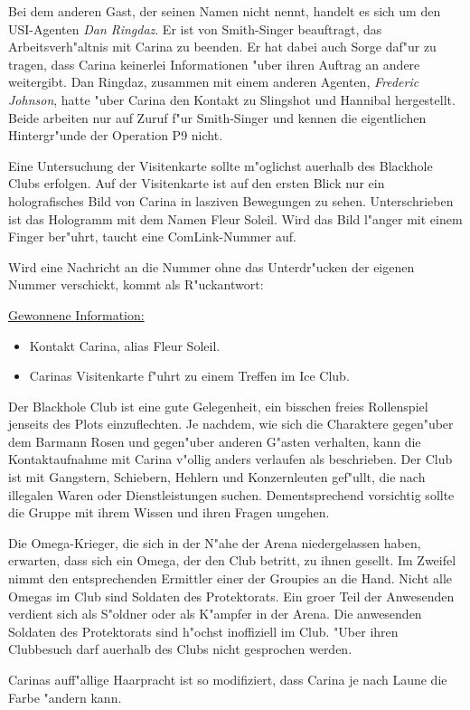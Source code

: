 Bei dem anderen Gast, der seinen Namen nicht nennt, handelt es sich um den USI-Agenten \emph{Dan Ringdaz}. Er ist von Smith-Singer beauftragt, das Arbeitsverh"altnis mit Carina zu beenden. Er hat dabei auch Sorge daf"ur zu tragen, dass Carina keinerlei Informationen "uber ihren Auftrag an andere weitergibt. Dan Ringdaz, zusammen mit einem anderen Agenten, \emph{Frederic Johnson}, hatte "uber Carina den Kontakt zu Slingshot und Hannibal hergestellt. Beide arbeiten nur auf Zuruf f"ur Smith-Singer und kennen die eigentlichen Hintergr"unde der Operation P9 nicht.


Eine Untersuchung der Visitenkarte sollte m"oglichst au\3erhalb des Blackhole Clubs erfolgen. Auf der Visitenkarte ist auf den ersten Blick nur ein holografisches Bild von Carina in lasziven Bewegungen zu sehen. Unterschrieben ist das Hologramm mit dem Namen Fleur Soleil. Wird das Bild l"anger mit einem Finger ber"uhrt, taucht eine ComLink-Nummer auf.

Wird eine Nachricht an die Nummer ohne das Unterdr"ucken der eigenen Nummer verschickt, kommt als R"uckantwort: 

\begin{remarks}
	\underline{Gewonnene Information:}

	\begin{itemize}
		\item Kontakt Carina, alias Fleur Soleil.
		\item Carinas Visitenkarte f"uhrt zu einem Treffen im Ice Club.
	\end{itemize}

	Der Blackhole Club ist eine gute Gelegenheit, ein bisschen freies Rollenspiel jenseits des Plots einzuflechten. Je nachdem, wie sich die Charaktere gegen"uber dem Barmann Rosen und gegen"uber anderen G"asten verhalten, kann die Kontaktaufnahme mit Carina v"ollig anders verlaufen als beschrieben. Der Club ist mit Gangstern, Schiebern, Hehlern und Konzernleuten gef"ullt, die nach illegalen Waren oder Dienstleistungen suchen. Dementsprechend vorsichtig sollte die Gruppe mit ihrem Wissen und ihren Fragen umgehen.

	Die Omega-Krieger, die sich in der N"ahe der Arena niedergelassen haben, erwarten, dass sich ein Omega, der den Club betritt, zu ihnen gesellt. Im Zweifel nimmt den entsprechenden Ermittler einer der Groupies an die Hand. Nicht alle Omegas im Club sind Soldaten des Protektorats. Ein gro\3er Teil der Anwesenden verdient sich als S"oldner oder als K"ampfer in der Arena. Die anwesenden Soldaten des Protektorats sind h"ochst inoffiziell im Club. "Uber ihren Clubbesuch darf au\3erhalb des Clubs nicht gesprochen werden.
	
	Carinas auff"allige Haarpracht ist so modifiziert, dass Carina je nach Laune die Farbe "andern kann.
\end{remarks}


